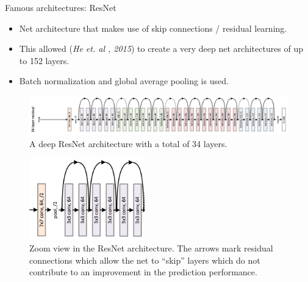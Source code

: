 \begin{vbframe}{Famous architectures: ResNet}
  \begin{itemize}
    \item Net architecture that makes use of skip connections / residual learning.
    \item This allowed (\textit{He et. al , 2015}) to create a very deep net architectures of up to 152 layers.
    \item Batch normalization and global average pooling is used.
  \end{itemize}
\framebreak
  \begin{figure}
  \centering
    \includegraphics[width=11.5cm]{plots/architectures/resnet.png}
    \caption{A deep ResNet architecture with a total of 34 layers. }
  \end{figure}
\framebreak
  \begin{figure}
  \centering
    \includegraphics[width=5cm]{plots/architectures/resnet_zoom.png}
    \caption{Zoom view in the ResNet architecture. The arrows mark residual connections which allow the net to \enquote{skip} layers which do not contribute to an improvement in the prediction performance.}
  \end{figure}
\end{vbframe}


